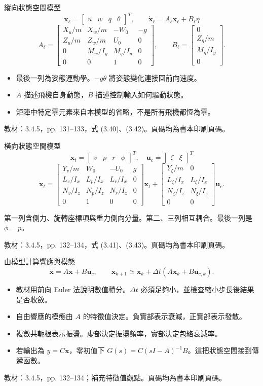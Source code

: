 \documentclass[aspectratio=169,11pt]{beamer}
\newcommand{\src}[1]{\par\vfill{\scriptsize\color{teal}教材：#1。頁碼均為書本印刷頁碼。}}
\newcommand{\slide}[3]{\begin{frame}[t]{#1}#3\src{#2}\end{frame}}
\newcommand{\bi}{\begin{itemize}\setlength{\itemsep}{5pt}}
\newcommand{\ei}{\end{itemize}}
\newcommand{\key}[1]{\par\medskip{\color{teal}\bfseries #1}\par\smallskip}
\begin{document}
\slide{縱向狀態空間模型}{3.4.5，pp. 131--133，式 (3.40)、(3.42)}{
\small
\[\mathbf x_\ell=\begin{bmatrix}u&w&q&\theta\end{bmatrix}^{T},
\qquad\dot{\mathbf x}_\ell=A_\ell\mathbf x_\ell+B_\ell\eta\]
\[A_\ell=\begin{bmatrix}
X_u/m&X_w/m&-W_0&-g\\
Z_u/m&Z_w/m&U_0&0\\
0&M_w/I_y&M_q/I_y&0\\
0&0&1&0
\end{bmatrix},\qquad
B_\ell=\begin{bmatrix}0\\Z_\eta/m\\M_\eta/I_y\\0\end{bmatrix}.\]
\bi
\item 最後一列為姿態運動學。$-g\theta$ 將姿態變化連接回前向速度。
\item $A$ 描述飛機自身動態，$B$ 描述控制輸入如何驅動狀態。
\item 矩陣中特定零元素來自本模型的省略，不是所有飛機都恆為零。
\ei
}
\slide{橫向狀態空間模型}{3.4.5，pp. 132--134，式 (3.41)、(3.43)}{
\small
\[\mathbf x_t=\begin{bmatrix}v&p&r&\phi\end{bmatrix}^{T},
\quad\mathbf u_c=\begin{bmatrix}\zeta&\xi\end{bmatrix}^{T}\]
\[\dot{\mathbf x}_t=
\begin{bmatrix}
Y_v/m&W_0&-U_0&g\\
L_v/I_x&L_p/I_x&L_r/I_x&0\\
N_v/I_z&N_p/I_z&N_r/I_z&0\\
0&1&0&0
\end{bmatrix}\mathbf x_t+
\begin{bmatrix}
Y_\zeta/m&0\\
L_\zeta/I_x&L_\xi/I_x\\
N_\zeta/I_z&N_\xi/I_z\\
0&0
\end{bmatrix}\mathbf u_c.\]
\key{物理對照}第一列含側力、旋轉座標項與重力側向分量。第二、三列相互耦合。最後一列是 $\dot\phi=p$。
}
\slide{由模型計算響應與模態}{3.4.5，pp. 132--134；補充特徵值觀點}{
\[\dot{\mathbf x}=A\mathbf x+B\mathbf u_c,\qquad
\mathbf x_{k+1}\simeq\mathbf x_k+\Delta t(A\mathbf x_k+B\mathbf u_{c,k}).\]
\bi
\item 教材用前向 Euler 法說明數值積分。$\Delta t$ 必須足夠小，並檢查縮小步長後結果是否收斂。
\item 自由響應的模態由 $A$ 的特徵值決定。負實部表示衰減，正實部表示發散。
\item 複數共軛根表示振盪。虛部決定振盪頻率，實部決定包絡衰減率。
\item 若輸出為 $y=C\mathbf x$，零初值下 $G(s)=C(sI-A)^{-1}B$。這把狀態空間接到傳遞函數。
\ei
}
\end{document}
